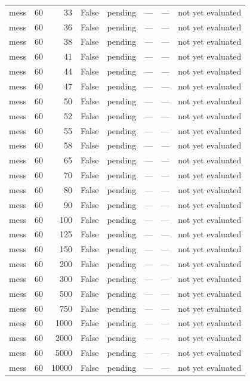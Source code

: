 \begin{tabular}{lrrrlrrl}
mess & 60 & 33 & False & pending & — & — & not yet evaluated \\
mess & 60 & 36 & False & pending & — & — & not yet evaluated \\
mess & 60 & 38 & False & pending & — & — & not yet evaluated \\
mess & 60 & 41 & False & pending & — & — & not yet evaluated \\
mess & 60 & 44 & False & pending & — & — & not yet evaluated \\
mess & 60 & 47 & False & pending & — & — & not yet evaluated \\
mess & 60 & 50 & False & pending & — & — & not yet evaluated \\
mess & 60 & 52 & False & pending & — & — & not yet evaluated \\
mess & 60 & 55 & False & pending & — & — & not yet evaluated \\
mess & 60 & 58 & False & pending & — & — & not yet evaluated \\
mess & 60 & 65 & False & pending & — & — & not yet evaluated \\
mess & 60 & 70 & False & pending & — & — & not yet evaluated \\
mess & 60 & 80 & False & pending & — & — & not yet evaluated \\
mess & 60 & 90 & False & pending & — & — & not yet evaluated \\
mess & 60 & 100 & False & pending & — & — & not yet evaluated \\
mess & 60 & 125 & False & pending & — & — & not yet evaluated \\
mess & 60 & 150 & False & pending & — & — & not yet evaluated \\
mess & 60 & 200 & False & pending & — & — & not yet evaluated \\
mess & 60 & 300 & False & pending & — & — & not yet evaluated \\
mess & 60 & 500 & False & pending & — & — & not yet evaluated \\
mess & 60 & 750 & False & pending & — & — & not yet evaluated \\
mess & 60 & 1000 & False & pending & — & — & not yet evaluated \\
mess & 60 & 2000 & False & pending & — & — & not yet evaluated \\
mess & 60 & 5000 & False & pending & — & — & not yet evaluated \\
mess & 60 & 10000 & False & pending & — & — & not yet evaluated \\

\end{tabular}
